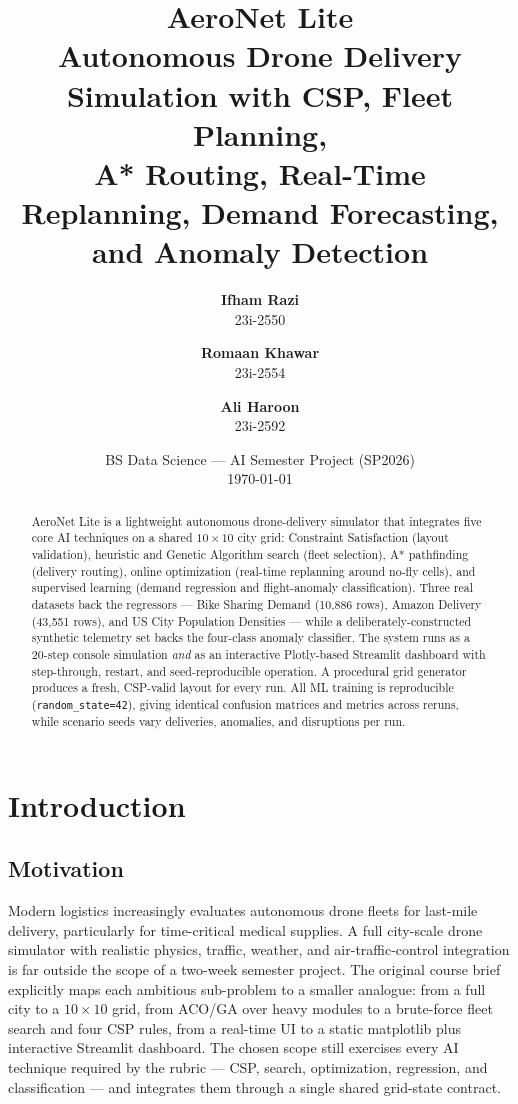 \documentclass[11pt,a4paper]{article}
\title{
  \vspace{-1.5cm}
  \textbf{AeroNet Lite}\\[0.4em]
  \large Autonomous Drone Delivery Simulation with CSP, Fleet Planning,\\
  A* Routing, Real-Time Replanning, Demand Forecasting, and Anomaly Detection
}
\author{
  \textbf{Ifham Razi} \\ 23i-2550
  \and
  \textbf{Romaan Khawar} \\ 23i-2554
  \and
  \textbf{Ali Haroon} \\ 23i-2592
}
\date{BS Data Science --- AI Semester Project (SP2026) \\ \today}
\begin{document}
\maketitle

\begin{abstract}
\noindent
AeroNet Lite is a lightweight autonomous drone-delivery simulator that
integrates five core AI techniques on a shared $10\!\times\!10$ city grid:
Constraint Satisfaction (layout validation), heuristic and Genetic
Algorithm search (fleet selection), A* pathfinding (delivery routing),
online optimization (real-time replanning around no-fly cells), and
supervised learning (demand regression and flight-anomaly classification).
Three real datasets back the regressors --- Bike Sharing Demand
(10{,}886 rows), Amazon Delivery (43{,}551 rows), and US City Population
Densities --- while a deliberately-constructed synthetic telemetry set
backs the four-class anomaly classifier. The system runs as a 20-step
console simulation \emph{and} as an interactive Plotly-based Streamlit
dashboard with step-through, restart, and seed-reproducible operation.
A procedural grid generator produces a fresh, CSP-valid layout for every
run. All ML training is reproducible (\texttt{random\_state=42}), giving
identical confusion matrices and metrics across reruns, while scenario
seeds vary deliveries, anomalies, and disruptions per run.
\end{abstract}

\vspace{0.4em}
\noindent\hrulefill\par
\tableofcontents
\noindent\hrulefill

\section{Introduction}
\label{sec:intro}

\subsection{Motivation}
Modern logistics increasingly evaluates autonomous drone fleets for
last-mile delivery, particularly for time-critical medical supplies. A
full city-scale drone simulator with realistic physics, traffic, weather,
and air-traffic-control integration is far outside the scope of a
two-week semester project. The original course brief explicitly maps
each ambitious sub-problem to a smaller analogue: from a full city to a
$10\!\times\!10$ grid, from ACO/GA over heavy modules to a brute-force
fleet search and four CSP rules, from a real-time UI to a static
matplotlib plus interactive Streamlit dashboard. The chosen scope still
exercises every AI technique required by the rubric --- CSP, search,
optimization, regression, and classification --- and integrates them
through a single shared grid-state contract.
\end{document}
